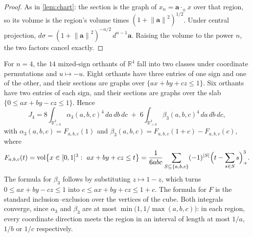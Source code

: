 \documentclass[11pt]{article}
\theoremstyle{definition}
\newcommand{\R}{\mathbb{R}}
\newcommand{\norm}[1]{\left\lVert #1 \right\rVert}
\begin{document}
\begin{proof}
As in \cref{lem:chart}: the section is the graph of $x_n=\boldsymbol a\cdot_\pm x$ over that region, so its volume is the region's volume times $(1+\norm{\boldsymbol a}^2)^{1/2}$. Under central projection, $d\sigma=(1+\norm{\boldsymbol a}^2)^{-n/2}\,d^{n-1}\boldsymbol a$. Raising the volume to the power $n$, the two factors cancel exactly.
\end{proof}

For $n=4$, the $14$ mixed-sign orthants of $\R^4$ fall into two classes under coordinate permutations and $u\mapsto-u$. Eight orthants have three entries of one sign and one of the other, and their sections are graphs over $\{ax+by+cz\le1\}$. Six orthants have two entries of each sign, and their sections are graphs over the slab $\{0\le ax+by-cz\le1\}$. Hence
\[
J_4=8\int_{\R_{>0}^3}\alpha_3(a,b,c)^4\,da\,db\,dc\;+\;6\int_{\R_{>0}^3}\beta_3(a,b,c)^4\,da\,db\,dc,
\]
with $\alpha_3(a,b,c)=F_{a,b,c}(1)$ and $\beta_3(a,b,c)=F_{a,b,c}(1+c)-F_{a,b,c}(c)$, where
\[
F_{a,b,c}(t)=\operatorname{vol}\bigl\{x\in[0,1]^3:\ ax+by+cz\le t\bigr\}
=\frac{1}{6abc}\sum_{S\subseteq\{a,b,c\}}(-1)^{|S|}\Bigl(t-\sum_{s\in S}s\Bigr)_+^{3}.
\]
The formula for $\beta_3$ follows by substituting $z\mapsto1-z$, which turns $0\le ax+by-cz\le1$ into $c\le ax+by+cz\le 1+c$. The formula for $F$ is the standard inclusion--exclusion over the vertices of the cube. Both integrals converge, since $\alpha_3$ and $\beta_3$ are at most $\min\bigl(1,1/\max(a,b,c)\bigr)$: in each region, every coordinate direction meets the region in an interval of length at most $1/a$, $1/b$ or $1/c$ respectively.
\end{document}
